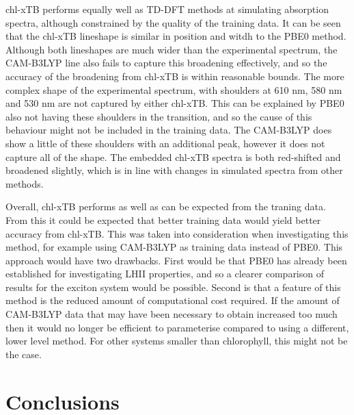 chl-xTB performs equally well as TD-DFT methods at simulating absorption
spectra, although constrained by the quality of the training data.
It can be seen that the chl-xTB lineshape is similar in position and witdh to the
PBE0 method. Although both lineshapes are much wider than the experimental spectrum,
the CAM-B3LYP line also fails to capture this broadening effectively, and so the
accuracy of the broadening from chl-xTB is within reasonable bounds.
The more complex shape of the experimental spectrum, with shoulders at 610 nm,
580 nm and 530 nm are not captured by either chl-xTB. This can be explained by PBE0
also not having these shoulders in the \Qy transition, and so the cause of this
behaviour might not be included in the training data. The CAM-B3LYP does show a
little of these shoulders with an additional peak, however it does not capture 
all of the shape.
The embedded chl-xTB spectra is both red-shifted and broadened slightly, which is
in line with changes in simulated spectra from other methods.

Overall, chl-xTB performs as well as can be expected from the traning data. From
this it could be expected that better training data would yield better accuracy
from chl-xTB. This was taken into consideration when investigating this method,
for example using CAM-B3LYP as training data instead of PBE0. This approach would
have two drawbacks. First would be that PBE0 has already been established for investigating
LHII properties, and so a clearer comparison of results for the exciton system would
be possible. Second is that a feature of this method is the reduced amount of 
computational cost required. If the amount of CAM-B3LYP data that may have been 
necessary to obtain increased too much then it would no longer be efficient to 
parameterise compared to using a different, lower level method. For other systems
smaller than chlorophyll, this might not be the case.

\section{Conclusions}



